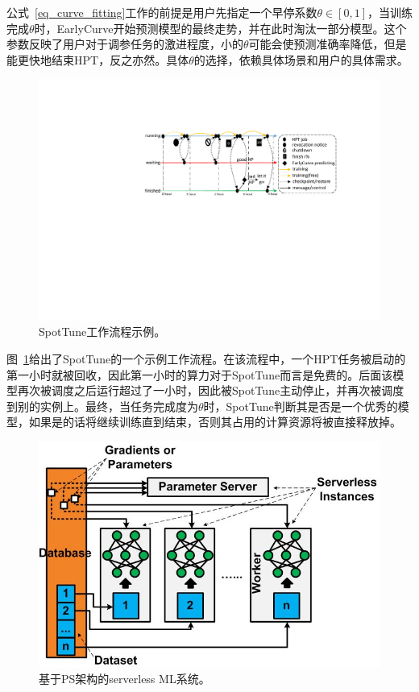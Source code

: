 公式~\ref{eq_curve_fitting}工作的前提是用户先指定一个早停系数$\theta \in [0, 1]$，当训练完成$\theta$时，EarlyCurve开始预测模型的最终走势，并在此时淘汰一部分模型。这个参数反映了用户对于调参任务的激进程度，小的$\theta$可能会使预测准确率降低，但是能更快地结束HPT，反之亦然。具体$\theta$的选择，依赖具体场景和用户的具体需求。

\begin{figure}[h]
    \centerline{\includegraphics[width=\textwidth]{figures/example_workflow_fat_v4.pdf}}
    \caption{SpotTune工作流程示例。}
    \label{example_spottune}
\end{figure}

图~\ref{example_spottune}给出了SpotTune的一个示例工作流程。在该流程中，一个HPT任务被启动的第一小时就被回收，因此第一小时的算力对于SpotTune而言是免费的。后面该模型再次被调度之后运行超过了一小时，因此被SpotTune主动停止，并再次被调度到别的实例上。最终，当任务完成度为$\theta$时，SpotTune判断其是否是一个优秀的模型，如果是的话将继续训练直到结束，否则其占用的计算资源将被直接释放掉。

\begin{figure}[h]
    \centerline{\includegraphics[width=\textwidth]{figures/data-para-faas-ml.jpg}}
    \caption{基于PS架构的serverless ML系统。}
    \label{data_para_faas_ml}
\end{figure}

